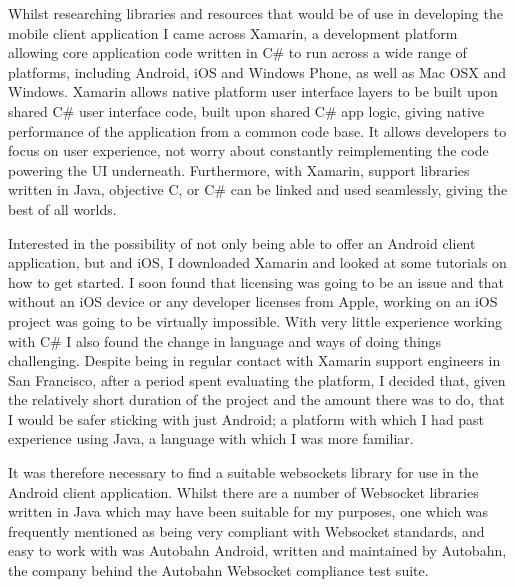 Whilst researching libraries and resources that would be of use in developing the mobile client application I came across Xamarin, a development platform allowing core application code written in C\# to run across a wide range of platforms, including Android, iOS and Windows Phone, as well as Mac OSX and Windows.\cite{xamarin}  Xamarin allows native platform user interface layers to be built upon shared C\# user interface code, built upon shared C\# app logic, giving native performance of the application from a common code base.  It allows developers to focus on user experience, not worry about constantly reimplementing the code powering the UI underneath.  Furthermore, with Xamarin, support libraries written in Java, objective C, or C\# can be linked and used seamlessly, giving the best of all worlds.

Interested in the possibility of not only being able to offer an Android client application, but and iOS, I downloaded Xamarin and looked at some tutorials on how to get started.  I soon found that licensing was going to be an issue and that without an iOS device or any developer licenses from Apple, working on an iOS project was going to be virtually impossible.  With very little experience working with C\# I also found the change in language and ways of doing things challenging.  Despite being in regular contact with Xamarin support engineers in San Francisco, after a period spent evaluating the platform, I decided that, given the relatively short duration of the project and the amount there was to do, that I would be safer sticking with just Android; a platform with which I had past experience using Java, a language with which I was more familiar.

It was therefore necessary to find a suitable websockets library for use in the Android client application.  Whilst there are a number of Websocket libraries written in Java which may have been suitable for my purposes, one which was frequently mentioned as being very compliant with Websocket standards, and easy to work with was Autobahn Android, written and maintained by Autobahn, the company behind the Autobahn Websocket compliance test suite.